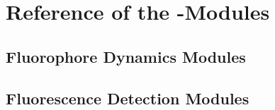 
\chapter{Reference of the \df-Modules}
\label{sec:ReferenceOfTheDfModules}
\section{Fluorophore Dynamics Modules}
\label{sec:TrajectoryModules}

\section{Fluorescence Detection Modules}
\label{sec:DetectionModules}
